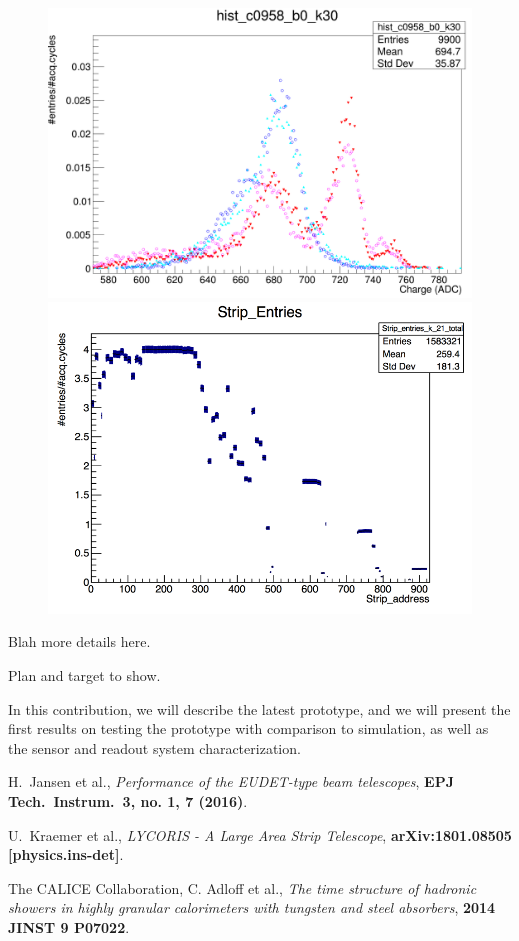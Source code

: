 \begin{figure}[!ht]%
\centering
\includegraphics[width=0.49\linewidth]{pics/hist1.jpg}
\includegraphics[width=0.49\linewidth]{pics/S58_K2_2018_05_07_16_49_42_strip_entries.png}
\caption{}%
\label{fig:2figs}%
\end{figure}

Blah more details here.

Plan and target to show.

In this contribution, we will describe the latest \lycoris prototype, and we will present the first results on testing the prototype with comparison to simulation, as well as the sensor and readout system characterization.

\footnotesize
\begin{thebibliography}{1}

 H.~Jansen et al., {\em Performance of the EUDET-type beam telescopes},
\textbf{EPJ Tech.\ Instrum.\  {\bf 3}, no. 1, 7 (2016)}.

 U.~Kraemer et al., {\em LYCORIS - A Large Area Strip Telescope},
\textbf{arXiv:1801.08505 [physics.ins-det]}.


 The CALICE Collaboration, C. Adloff et al., {\em The time structure of hadronic showers in highly granular calorimeters with tungsten and
steel absorbers}, \textbf{2014 JINST 9 P07022}.

\end{thebibliography}


